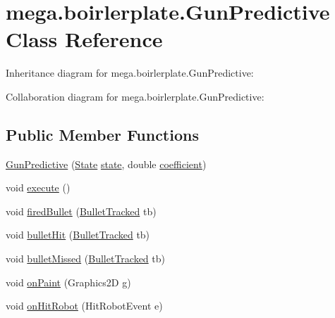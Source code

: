 \hypertarget{classmega_1_1boirlerplate_1_1_gun_predictive}{}\section{mega.\+boirlerplate.\+Gun\+Predictive Class Reference}
\label{classmega_1_1boirlerplate_1_1_gun_predictive}


Inheritance diagram for mega.\+boirlerplate.\+Gun\+Predictive\+:


Collaboration diagram for mega.\+boirlerplate.\+Gun\+Predictive\+:
\subsection*{Public Member Functions}
\begin{DoxyCompactItemize}
\item 
\hyperlink{classmega_1_1boirlerplate_1_1_gun_predictive_a8e8379f079e74bebc7328ebfc07998b3}{Gun\+Predictive} (\hyperlink{classmega_1_1boirlerplate_1_1_state}{State} \hyperlink{classmega_1_1boirlerplate_1_1_component_a87b0d70f323b5fee60a200e07c9c20fd}{state}, double \hyperlink{classmega_1_1boirlerplate_1_1_gun_predictive_adb89d8361c33446c988ec16765cab95f}{coefficient})
\item 
void \hyperlink{classmega_1_1boirlerplate_1_1_gun_predictive_ad21caa3ccb0d1b00d728140302aa4a85}{execute} ()
\item 
void \hyperlink{classmega_1_1boirlerplate_1_1_gun_predictive_a5bbabbb6466f8d0fbd48b82f7524e59f}{fired\+Bullet} (\hyperlink{classmega_1_1boirlerplate_1_1_bullet_tracked}{Bullet\+Tracked} tb)
\item 
void \hyperlink{classmega_1_1boirlerplate_1_1_gun_predictive_a55ad510962363718b3f8b44dcda046b7}{bullet\+Hit} (\hyperlink{classmega_1_1boirlerplate_1_1_bullet_tracked}{Bullet\+Tracked} tb)
\item 
void \hyperlink{classmega_1_1boirlerplate_1_1_gun_predictive_acf9a79922365c5aab5e5d97afd743877}{bullet\+Missed} (\hyperlink{classmega_1_1boirlerplate_1_1_bullet_tracked}{Bullet\+Tracked} tb)
\item 
void \hyperlink{classmega_1_1boirlerplate_1_1_gun_predictive_a43f6f25bd8c0e030ce01154a2491a049}{on\+Paint} (Graphics2D g)
\item 
void \hyperlink{classmega_1_1boirlerplate_1_1_gun_predictive_ac6e77d2d414fda91759b067a3dd1013b}{on\+Hit\+Robot} (Hit\+Robot\+Event e)
\end{DoxyCompactItemize}
